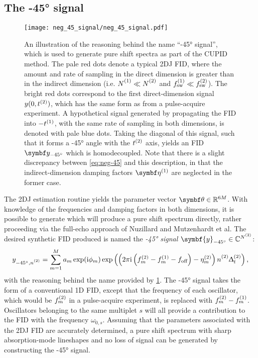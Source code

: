 \subsection{The \ang{-45} signal}
\begin{figure}
    \centering
    \texttt{[image: neg\_45\_signal/neg\_45\_signal.pdf]}
    \caption[
        An illustration of the reasoning behind the name ``\ang{-45}
        signal'' used to generate pure shift spectra as part of the \acs{CUPID}
        method.
    ]{
        An illustration of the reasoning behind the name ``\ang{-45}
        signal'', which is used to generate pure shift spectra as part of the
        \ac{CUPID} method. The pale red
        dots denote
        a typical \ac{2DJ} \ac{FID}, where
        the amount and rate of sampling in the direct dimension is greater than
        in the indirect dimension (i.e. $\None \ll \Ntwo$ and $f_{\mathrm{sw}}^{(1)} \ll
        f_{\mathrm{sw}}^{(2)}$). The bright red dots correspond to the first direct-dimension
        signal $y(0,t^{(2)})$, which has the same form as
         from a pulse-acquire experiment. A hypothetical signal
        generated by propagating the \ac{FID} into $-t^{(1)}$, with the same rate
        of sampling in both dimensions, is denoted with pale blue dots. Taking
        the diagonal of this signal, such that it forms a \ang{-45} angle with the
        $t^{(2)}$ axis, yields an \ac{FID} $\by_{\ang{-45}}$  which is
        homodecoupled. Note that there is a slight discrepancy
        between \cref{eq:neg-45} and this description, in that the
        indirect-dimension damping factors $\bdetaone$ are neglected in the
        former case.
    }
    \label{fig:neg-45}
\end{figure}
The \ac{2DJ} estimation routine yields the parameter vector $\bth \in
\mathbb{R}^{6M}$. With
knowledge of the frequencies and damping factors in both dimensions, it is
possible to generate  which will produce a pure shift spectrum
directly, rather proceeding via the full-echo approach of Nuzillard and
Mutzenhardt et al.
The desired synthetic \ac{FID} produced is named the \emph{\ang{-45} signal}
$\symbf{y}_{\ang{-45}} \in \mathbb{C}^{\Ntwo}$:
\begin{equation}
    y_{\ang{-45},\ntwo} =
        \sum_{m=1}^{M} a_m \exp (\iu \phi_m)
        \exp\left(\left(2 \pi \iu \left(\ftwo_m - \fone_m - \foff\right)
                - \etatwo_m
            \right) \ntwo \Dttwo
        \right),
    \label{eq:neg-45}
\end{equation}
with the reasoning behind the name provided by \cref{fig:neg-45}.
The \ang{-45} signal
takes the form of a conventional \ac{1D} \ac{FID},
except that the frequency of each oscillator, which would be $f^{(2)}_m$ in a
pulse-acquire experiment,
is replaced with $f^{(2)}_m - f^{(1)}_m$. Oscillators belonging to the same
multiplet $s$ will all provide a contribution to the \ac{FID} with the
frequency $\omega_{0,s}$.
Assuming that the parameters associated with the \ac{2DJ}
\ac{FID} are accurately determined, a pure shift spectrum with sharp
absorption-mode lineshapes and no loss of signal can be generated by
constructing the \ang{-45} signal.


